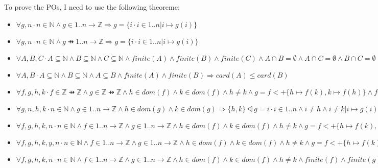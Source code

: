 To prove the POs, I need to use the following theoreme: 
\begin{itemize}
\item $\forall g,n \cdot n \in \mathbb{N} \land g \in 1..n \to \mathbb{Z} \Rightarrow g=\{i \cdot i \in 1..n | i \mapsto g(i)\}$
\item $\forall g,n \cdot n \in \mathbb{N} \land g \pfun 1..n \to \mathbb{Z} \Rightarrow g= \{i \cdot i \in 1..n | i \mapsto g(i)\}$
\item $\forall A,B,C \cdot A \subseteq \mathbb{N} \land B \subseteq \mathbb{N} \land C \subseteq \mathbb{N} \land finite(A) \land finite(B) \land finite(C) \land A \cap B = \emptyset \land A \cap C = \emptyset \land B \cap C = \emptyset \Rightarrow card(A \cup B \cup C) = card(A) + card(B) + card(C)$

\item $\forall A,B \cdot A \subseteq \mathbb{N} \land B \subseteq \mathbb{N} \land A \subseteq B \land finite(A) \land finite(B)  \Rightarrow card(A) \leq card(B)$

\item $\forall f,g,h,k \cdot f \in \mathbb{Z} \pfun \mathbb{Z} \land g \in \mathbb{Z} \pfun \mathbb{Z} \land h \in dom(f) \land k \in dom(f) \land h \neq k \land g = f <+ \{h \mapsto f(k), k \mapsto f(h)\} \land finite(f) \land finite(g) \Rightarrow dom(g) = dom(f)$

\item $\forall g,n,h,k \cdot n \in \mathbb{N} \land g \in 1..n \to \mathbb{Z} \land h \in dom(g) \land k \in dom(g) \Rightarrow \{h,k\} \dsub g = {i \cdot i \in 1..n \land i \neq h \land i \neq k | i \mapsto g(i)}$

\item $\forall f,g,h,k,n \cdot n \in \mathbb{N} \land f \in 1..n \to \mathbb{Z} \land g \in 1..n \to \mathbb{Z} \land h \in dom(f) \land k \in dom(f) \land h \neq k \land g = f <+ \{h \mapsto f(k), k \mapsto f(h)\} \land finite(f) \land finite(g) \Rightarrow ran(g) = ran(f)$

\item $\forall f,g,h,k,y,n \cdot n\in \mathbb{N} \land f \in 1..n \to \mathbb{Z} \land g \in 1..n \to \mathbb{Z} \land h \in dom(f) \land k \in dom(f) \land h \neq k \land g = f<+\{h \mapsto f(k), k \mapsto f(h) \} \land finite(f) \land finite(g) \land y \in ran(f) \Rightarrow card(\{u \cdot u \in dom(f) \land u \mapsto y \in f | u \}) =  card(\{x \cdot x \in dom(g) \land x \mapsto y \in g | x \})$

\item $\forall f,g,h,k,n \cdot n \in \mathbb{N} \land f \in 1..n \to \mathbb{Z} \land g \in 1..n \to \mathbb{Z} \land h \in dom(f) \land k \in dom(f) \land h \neq k \land finite(f) \land finite(g) \land (\forall i \cdot i \in 1..n \land i \neq h \land i \neq k \Rightarrow g(i)=f(i)) \land g(h)=f(k) \land g(k)=f(h) \Rightarrow g = f<+\{h \mapsto f(k), k \mapsto f(h)\}$
\end{itemize}
















